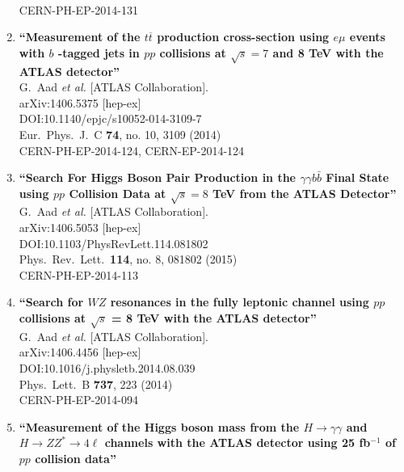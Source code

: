 \documentclass{article}
\begin{document}
\begin{enumerate}
  \\{}CERN-PH-EP-2014-131
\item%
{\bf ``Measurement of the $t\overline{t}$ production cross-section using $e\mu $ events with $b$ -tagged jets in $pp$ collisions at $\sqrt{s}=7$ and 8 TeV with the ATLAS detector''}
  \\{}G.~Aad {\it et al.} [ATLAS Collaboration].
  \\{}arXiv:1406.5375 [hep-ex]
  \\{}DOI:10.1140/epjc/s10052-014-3109-7
  \\{}Eur.\ Phys.\ J.\ C {\bf 74}, no. 10, 3109 (2014)
  \\{}CERN-PH-EP-2014-124, CERN-EP-2014-124
\item%
{\bf ``Search For Higgs Boson Pair Production in the $\gamma\gamma b\bar{b}$ Final State using $pp$ Collision Data at $\sqrt{s}=8$ TeV from the ATLAS Detector''}
  \\{}G.~Aad {\it et al.} [ATLAS Collaboration].
  \\{}arXiv:1406.5053 [hep-ex]
  \\{}DOI:10.1103/PhysRevLett.114.081802
  \\{}Phys.\ Rev.\ Lett.\  {\bf 114}, no. 8, 081802 (2015)
  \\{}CERN-PH-EP-2014-113
\item%
{\bf ``Search for $WZ$ resonances in the fully leptonic channel using $pp$ collisions at $\sqrt{s}$ = 8 TeV with the ATLAS detector''}
  \\{}G.~Aad {\it et al.} [ATLAS Collaboration].
  \\{}arXiv:1406.4456 [hep-ex]
  \\{}DOI:10.1016/j.physletb.2014.08.039
  \\{}Phys.\ Lett.\ B {\bf 737}, 223 (2014)
  \\{}CERN-PH-EP-2014-094
\item%
{\bf ``Measurement of the Higgs boson mass from the $H\rightarrow \gamma\gamma$ and $H \rightarrow ZZ^{*} \rightarrow 4\ell$ channels with the ATLAS detector using 25 fb$^{-1}$ of $pp$ collision data''}

\end{enumerate}
\end{document}
